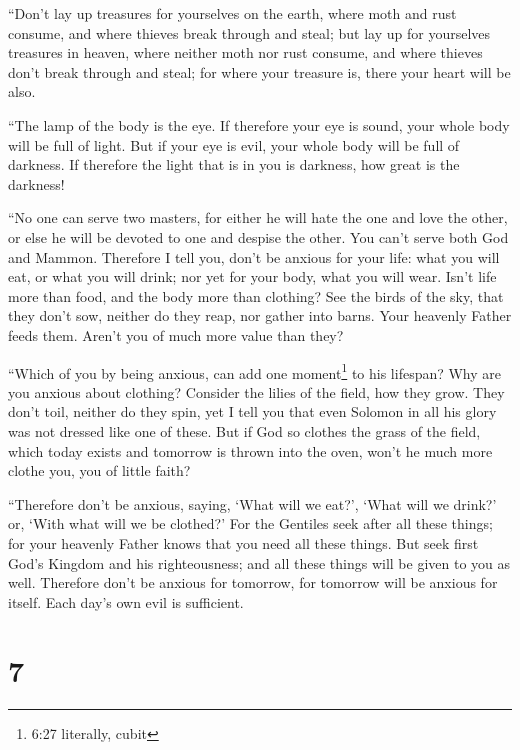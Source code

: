  ``Don't lay up treasures for yourselves on the earth,
where moth and rust consume, and where thieves break through and steal;
 but lay up for yourselves treasures in heaven, where
neither moth nor rust consume, and where thieves don't break through and
steal;  for where your treasure is, there your heart will
be also.

 ``The lamp of the body is the eye. If therefore your eye
is sound, your whole body will be full of light.  But if
your eye is evil, your whole body will be full of darkness. If therefore
the light that is in you is darkness, how great is the darkness!

 ``No one can serve two masters, for either he will hate
the one and love the other, or else he will be devoted to one and
despise the other. You can't serve both God and Mammon. 
Therefore I tell you, don't be anxious for your life: what you will eat,
or what you will drink; nor yet for your body, what you will wear. Isn't
life more than food, and the body more than clothing?  See
the birds of the sky, that they don't sow, neither do they reap, nor
gather into barns. Your heavenly Father feeds them. Aren't you of much
more value than they?

 ``Which of you by being anxious, can add one
moment\footnote{6:27 literally, cubit} to his lifespan? 
Why are you anxious about clothing? Consider the lilies of the field,
how they grow. They don't toil, neither do they spin,  yet
I tell you that even Solomon in all his glory was not dressed like one
of these.  But if God so clothes the grass of the field,
which today exists and tomorrow is thrown into the oven, won't he much
more clothe you, you of little faith?

 ``Therefore don't be anxious, saying, `What will we eat?',
`What will we drink?' or, `With what will we be clothed?' 
For the Gentiles seek after all these things; for your heavenly Father
knows that you need all these things.  But seek first God's
Kingdom and his righteousness; and all these things will be given to you
as well.  Therefore don't be anxious for tomorrow, for
tomorrow will be anxious for itself. Each day's own evil is sufficient.

\hypertarget{section-6}{%
\section{7}\label{section-6}}

